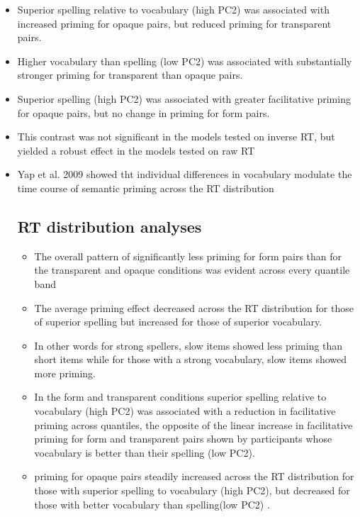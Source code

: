 \documentclass[]{article}
\begin{document}
{\begin{itemize}
			\item Superior spelling relative to vocabulary (high PC2) was associated with increased priming for opaque pairs, but reduced priming for transparent pairs. 
			\item Higher vocabulary than spelling (low PC2) was associated with substantially stronger priming for transparent than opaque pairs. 
			\item Superior spelling (high PC2) was associated with greater facilitative priming for opaque pairs, but no change in priming for form pairs.
			\item This contrast was not significant in the models tested on inverse RT, but yielded a robust effect in the models tested on raw RT 
			\item Yap et al. 2009 showed tht individual differences in vocabulary modulate the time course of semantic priming across the RT distribution
			
			\subsection{RT distribution analyses}
			\begin{itemize}
				\item The overall pattern of significantly less priming for form pairs than for the transparent and opaque conditions was evident across every quantile band
				\item The average priming effect decreased across the RT distribution for those of superior spelling but increased for those of superior vocabulary.
				\item In other words for strong spellers, slow items showed less priming than short items while for those with a strong vocabulary, slow items showed more priming.
				\item In the form and transparent conditions superior spelling relative to vocabulary (high PC2) was associated with a reduction in facilitative priming across quantiles, the opposite of the linear increase in facilitative priming for form and transparent pairs shown by  participants whose vocabulary is better than their spelling (low PC2).
				\item priming for opaque pairs steadily increased across the RT distribution for those with superior spelling to vocabulary (high PC2), but decreased for those with better vocabulary than spelling(low PC2) .
				
			\end{itemize}			
			 

\end{itemize}}
\end{document}

